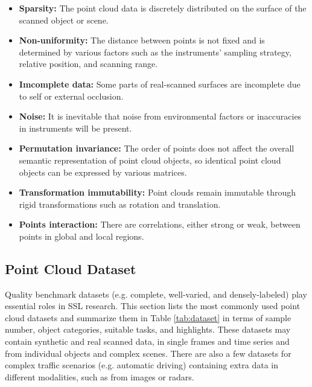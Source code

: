 \documentclass[a4paper,fleqn]{cas-dc}
\begin{document}
\begin{itemize}
    \item \textbf{Sparsity:} The point cloud data is discretely distributed on the surface of the scanned object or scene.
    \item \textbf{Non-uniformity:} The distance between points is not fixed and is determined by various factors such as the instruments' sampling strategy, relative position, and scanning range.
    \item \textbf{Imcomplete data:} Some parts of real-scanned surfaces are incomplete due to self or external occlusion.
    \item \textbf{Noise:} It is inevitable that noise from environmental factors or inaccuracies in instruments will be present.
    \item \textbf{Permutation invariance:} The order of points does not affect the overall semantic representation of point cloud objects, so identical point cloud objects can be expressed by various matrices.
    \item \textbf{Transformation immutability:} Point clouds remain immutable through rigid transformations such as rotation and translation.
    \item \textbf{Points interaction:} There are correlations, either strong or weak, between points in global and local regions.
\end{itemize}


\subsection{Point Cloud Dataset}\label{sec:data}
Quality benchmark datasets (e.g. complete, well-varied, and densely-labeled) play essential roles in SSL research. This section lists the most commonly used point cloud datasets and summarize them in Table \ref{tab:dataset} in terms of sample number, object categories, suitable tasks, and highlights. These datasets may contain synthetic and real scanned data, in single frames and time series and from individual objects and complex scenes. There are also a few datasets for complex traffic scenarios (e.g. automatic driving) containing extra data in different modalities, such as from images or radars.
\end{document}
